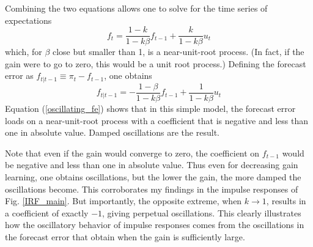 \documentclass[11pt]{article}
\renewcommand{\[}{\begin{equation}}
\renewcommand{\]}{\end{equation}}
\begin{document}
Combining the two equations allows one to solve for the time series of expectations
\begin{equation}
f_t = \frac{1-k}{1-k\beta}f_{t-1} + \frac{k}{1-k\beta}u_t
\end{equation}
which, for $\beta$ close but smaller than 1, is a near-unit-root process. (In fact, if the gain were to go to zero, this would be a unit root process.) Defining the forecast error as $f_{t|t-1} \equiv \pi_t - f_{t-1}$, one obtains
\begin{equation}
f_{t|t-1} = -\frac{1-\beta}{1-k\beta}f_{t-1} + \frac{1}{1-k\beta}u_t \label{oscillating_fe}
\end{equation}
Equation (\ref{oscillating_fe}) shows that in this simple model, the forecast error loads on a near-unit-root process with a coefficient that is negative and less than one in absolute value. Damped oscillations are the result. 

Note that even if the gain would converge to zero, the coefficient on $f_{t-1}$ would be negative and less than one in absolute value. Thus even for decreasing gain learning, one obtains oscillations, but the lower the gain, the more damped the oscillations become. This corroborates my findings in the impulse responses of Fig. \ref{IRF_main}. But importantly, the opposite extreme, when $k\rightarrow 1$, results in a coefficient of exactly $-1$, giving perpetual oscillations. This clearly illustrates how the oscillatory behavior of impulse responses comes from the oscillations in the forecast error that obtain when the gain is sufficiently large. 
\end{document}
